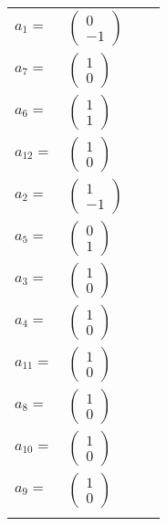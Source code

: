 \documentclass[1p]{elsarticle_modified}
\theoremstyle{definition}
\begin{document}
\begin{tabular}{m{7pt} m{180pt} m{7pt} m{180pt} }
\flushright $a_{1}=$&$\begin{pmatrix}0\\-1\end{pmatrix}$ \\
\flushright $a_{7}=$&$\begin{pmatrix}1\\0\end{pmatrix}$ \\
\flushright $a_{6}=$&$\begin{pmatrix}1\\1\end{pmatrix}$ \\
\flushright $a_{12}=$&$\begin{pmatrix}1\\0\end{pmatrix}$ \\
\flushright $a_{2}=$&$\begin{pmatrix}1\\-1\end{pmatrix}$ \\
\flushright $a_{5}=$&$\begin{pmatrix}0\\1\end{pmatrix}$ \\
\flushright $a_{3}=$&$\begin{pmatrix}1\\0\end{pmatrix}$ \\
\flushright $a_{4}=$&$\begin{pmatrix}1\\0\end{pmatrix}$ \\
\flushright $a_{11}=$&$\begin{pmatrix}1\\0\end{pmatrix}$ \\
\flushright $a_{8}=$&$\begin{pmatrix}1\\0\end{pmatrix}$ \\
\flushright $a_{10}=$&$\begin{pmatrix}1\\0\end{pmatrix}$ \\
\flushright $a_{9}=$&$\begin{pmatrix}1\\0\end{pmatrix}$\\&\end{tabular}
\end{document}
